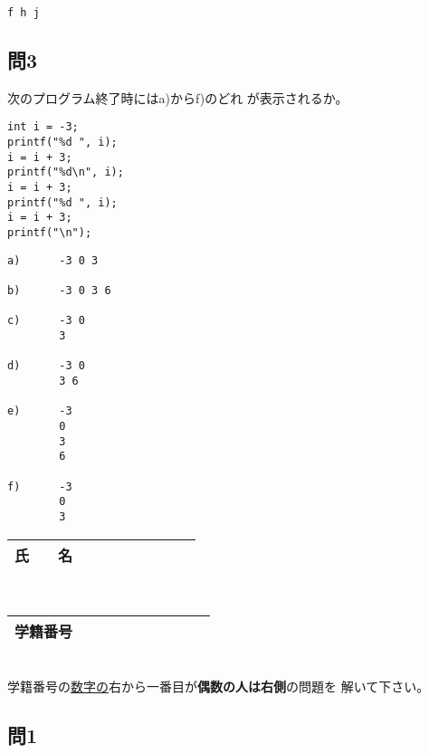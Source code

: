\documentclass[a4j]{jarticle}
\begin{document}
\begin{multicols*}{2}
\ifnum {}
\vspace*{1cm}
\else
\begin{verbatim}
f h j
\end{verbatim}
\fi







\subsection*{問3}

次のプログラム終了時には{\ttfamily a)}から{\ttfamily f)}のどれ
が表示されるか。
\begin{verbatim}
int i = -3;
printf("%d ", i);
i = i + 3;
printf("%d\n", i);
i = i + 3;
printf("%d ", i);
i = i + 3;
printf("\n");
\end{verbatim}

\begin{verbatim}
a)      -3 0 3

b)      -3 0 3 6

c)      -3 0
        3

d)      -3 0
        3 6

e)      -3
        0
        3
        6

f)      -3
        0
        3
\end{verbatim}




\vfill

\mbox{}





\noindent
\begin{tabular}[t]{|c|cccccccc|}\hline
氏　　名 & & & & & & & & \\ \hline
\end{tabular}\\
\begin{tabular}[t]{|c|c|c|c|c|c|c|c|c|c|}\hline
学籍番号 & & & & & & & & \\ \hline
\end{tabular}\\
学籍番号の\underline{数字の}右から一番目が{\bfseries 偶数の人は右側}の問題を
解いて下さい。
\vspace{-5ex}





\subsection*{問1}


\end{multicols*}
\end{document}
